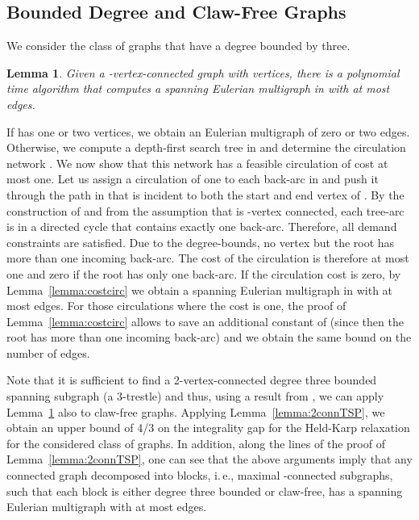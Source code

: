 \documentclass[letterpaper,11pt]{article}
\newtheorem{lemma}[theorem]{Lemma}
\newenvironment{proof}{\begin{trivlist}
\item[\hskip\labelsep {\bf Proof}.]}{\QED \end{trivlist}}
\newcommand{\QED}{\hfill }
\begin{document}
\subsection{Bounded Degree and Claw-Free Graphs}
We consider the class of graphs that have a degree bounded by three.
\begin{lemma}\label{lem:boundeddeg}
  Given a -vertex-connected graph  with  vertices, there is a
  polynomial time algorithm that computes a spanning Eulerian
  multigraph  in  with at most  edges.
\end{lemma}
\begin{proof}
  If  has one or two vertices, we obtain an Eulerian multigraph of
  zero or two edges. Otherwise, we compute a depth-first search tree
   in  and determine the circulation network . We now
  show that this network has a feasible circulation  of cost at
  most one. Let us assign a circulation of one to each back-arc  in
   and push it through the path in  that is incident
  to both the start and end vertex of . By the construction of
   and from the assumption that  is -vertex connected,
  each tree-arc is in a directed cycle that contains exactly one
  back-arc. Therefore, all demand constraints are satisfied. Due to
  the degree-bounds, no vertex but the root has more than one incoming
  back-arc. The cost  of
  the circulation is therefore at most one and zero if the root has
  only one back-arc.  If the circulation cost is zero, by
  Lemma~\ref{lemma:costcirc} we obtain a spanning Eulerian multigraph
   in  with at most  edges. For those circulations
  where the cost is one, the proof of Lemma~\ref{lemma:costcirc}
  allows to save an additional constant of  (since then the root
  has more than one incoming back-arc) and we obtain the same bound on
  the number of edges.

\end{proof}
Note that it is sufficient to find a 2-vertex-connected
degree three bounded spanning subgraph (a 3-trestle) and thus, using a
result from \cite{KKN01}, we can apply Lemma~\ref{lem:boundeddeg} also
to claw-free graphs.  Applying Lemma~\ref{lemma:2connTSP}, we obtain
an upper bound of 4/3 on the integrality gap for the Held-Karp
relaxation for the considered class of graphs. In addition, along the
lines of the proof of Lemma~\ref{lemma:2connTSP}, one can see that the
above arguments imply that any connected graph  decomposed into 
blocks, i.\,e., maximal -connected subgraphs, such that each block is
either degree three bounded or claw-free, has a spanning Eulerian
multigraph with at most  edges.
\end{document}
